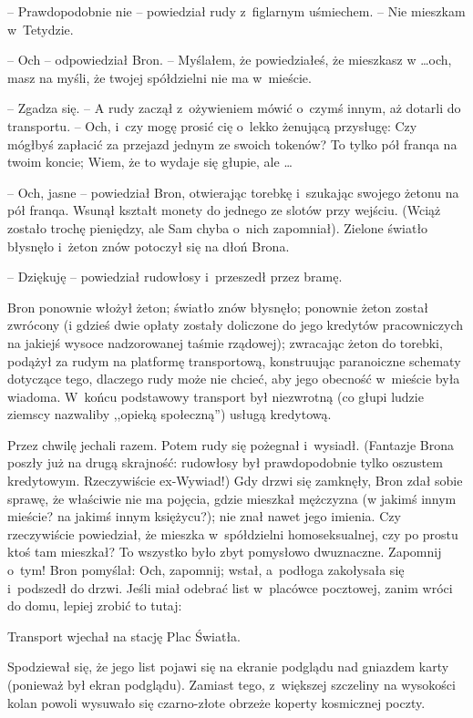 \documentclass[oneside,polish,11pt,rmheadings]{mwbk}
\begin{document}
-- Prawdopodobnie nie -- powiedział rudy z~figlarnym uśmiechem. -- Nie mieszkam w~Tetydzie. 

-- Och -- odpowiedział Bron. -- Myślałem, że powiedziałeś, że mieszkasz w \ldots  och, masz na myśli, że twojej spółdzielni nie ma w~mieście. 

-- Zgadza się. -- A rudy zaczął z~ożywieniem mówić o~czymś innym, aż dotarli do transportu. -- Och, i~czy mogę prosić cię o~lekko żenującą przysługę: Czy mógłbyś zapłacić za przejazd jednym ze swoich tokenów?  To tylko pół franqa na twoim koncie; Wiem, że to wydaje się głupie, ale \ldots  

-- Och, jasne -- powiedział Bron, otwierając torebkę i~szukając swojego żetonu na pół franqa. Wsunął kształt monety do jednego ze slotów przy wejściu. (Wciąż zostało trochę pieniędzy, ale Sam chyba o~nich zapomniał). Zielone światło błysnęło i~żeton znów potoczył się na dłoń Brona. 

-- Dziękuję -- powiedział rudowłosy i~przeszedł przez bramę. 

Bron ponownie włożył żeton; światło znów błysnęło; ponownie żeton został zwrócony (i gdzieś dwie opłaty zostały doliczone do jego kredytów pracowniczych na jakiejś wysoce nadzorowanej taśmie rządowej); zwracając żeton do torebki, podążył za rudym na platformę transportową, konstruując paranoiczne schematy dotyczące tego, dlaczego rudy może nie chcieć, aby jego obecność w~mieście była wiadoma. W~końcu podstawowy transport był niezwrotną (co głupi ludzie ziemscy nazwaliby ,,opieką społeczną'') usługą kredytową. 

Przez chwilę jechali razem. Potem rudy się pożegnał i~wysiadł. (Fantazje Brona poszły już na drugą skrajność: rudowłosy był prawdopodobnie tylko oszustem kredytowym. Rzeczywiście ex-Wywiad!) Gdy drzwi się zamknęły, Bron zdał sobie sprawę, że właściwie nie ma pojęcia, gdzie mieszkał mężczyzna (w jakimś innym mieście? na jakimś innym księżycu?); nie znał nawet jego imienia. Czy rzeczywiście powiedział, że mieszka w~spółdzielni homoseksualnej, czy po prostu ktoś tam mieszkał? To wszystko było zbyt pomysłowo dwuznaczne. Zapomnij o~tym! Bron pomyślał: Och, zapomnij; wstał, a~podłoga zakołysała się i~podszedł do drzwi. Jeśli miał odebrać list w~placówce pocztowej, zanim wróci do domu, lepiej zrobić to tutaj: 

Transport wjechał na stację Plac Światła. 

Spodziewał się, że jego list pojawi się na ekranie podglądu nad gniazdem karty (ponieważ był ekran podglądu). Zamiast tego,  z~większej szczeliny na wysokości kolan powoli wysuwało się czarno-złote obrzeże koperty kosmicznej poczty. 
\end{document}
